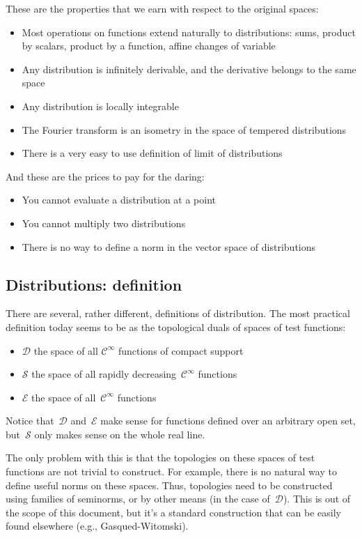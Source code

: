 These are the properties that we earn with respect to the original
spaces:
\begin{itemize}
	\item Most operations on functions extend naturally to
		distributions: sums, product by scalars, product by a function,
		affine changes of variable
	\item Any distribution is infinitely derivable, and the derivative
		belongs to the same space
	\item Any distribution is locally integrable
	\item The Fourier transform is an isometry in the space of
		tempered distributions
	\item There is a very easy to use definition of limit of
		distributions
\end{itemize}

And these are the prices to pay for the daring:
\begin{itemize}
	\item You cannot evaluate a distribution at a point
	\item You cannot multiply two distributions
	\item There is no way to define a norm in the vector space of
		distributions
\end{itemize}

\subsection{Distributions: definition}

There are several, rather different, definitions of distribution.
The most practical definition today seems to be as the topological
duals of spaces of test functions:

\begin{itemize}
	\item $\mathcal{D}$ the space of all $\mathcal{C}^\infty$
		functions of compact support
	\item $\mathcal{S}$ the space of all rapidly
		decreasing~$\mathcal{C}^\infty$ functions
	\item $\mathcal{E}$ the space of all~$\mathcal{C}^\infty$
		functions
\end{itemize}

Notice that~$\mathcal{D}$ and~$\mathcal{E}$ make sense for functions
defined over an arbitrary open set, but~$\mathcal{S}$ only makes
sense on the whole real line.

The only problem with this is that the topologies on these spaces of
test functions are not trivial to construct.  For example, there is
no natural way to define useful norms on these spaces.  Thus,
topologies need to be constructed using families of seminorms, or by
other means (in the case of~$\mathcal{D}$).  This is out of the scope
of this document, but it's a standard construction that can be easily
found elsewhere (e.g., Gasqued-Witomski).

